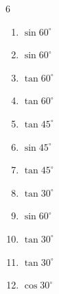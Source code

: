 \begin{multicols}{6}
\begin{enumerate}

  \item $\displaystyle \sin{60^\circ}$


  \item $\displaystyle \sin{60^\circ}$


  \item $\displaystyle \tan{60^\circ}$


  \item $\displaystyle \tan{60^\circ}$


  \item $\displaystyle \tan{45^\circ}$

        \phantom{$\displaystyle =1$}

  \item $\displaystyle \sin{45^\circ}$


  \item $\displaystyle \tan{45^\circ}$

        \phantom{$\displaystyle =1$}

  \item $\displaystyle \tan{30^\circ}$


  \item $\displaystyle \sin{60^\circ}$


  \item $\displaystyle \tan{30^\circ}$


  \item $\displaystyle \tan{30^\circ}$


  \item $\displaystyle \cos{30^\circ}$



\end{enumerate}
\end{multicols}
